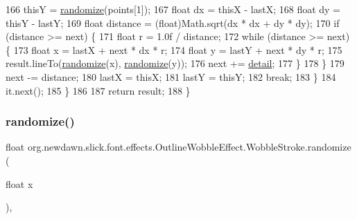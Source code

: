 \begin{DoxyCode}
166                     thisY = \mbox{\hyperlink{classorg_1_1newdawn_1_1slick_1_1font_1_1effects_1_1_outline_wobble_effect_1_1_wobble_stroke_a6aa4ed3188495bd4abcf9b2862615330}{randomize}}(points[1]);
167                     \textcolor{keywordtype}{float} dx = thisX - lastX;
168                     \textcolor{keywordtype}{float} dy = thisY - lastY;
169                     \textcolor{keywordtype}{float} distance = (float)Math.sqrt(dx * dx + dy * dy);
170                     \textcolor{keywordflow}{if} (distance >= next) \{
171                         \textcolor{keywordtype}{float} r = 1.0f / distance;
172                         \textcolor{keywordflow}{while} (distance >= next) \{
173                             \textcolor{keywordtype}{float} x = lastX + next * dx * r;
174                             \textcolor{keywordtype}{float} y = lastY + next * dy * r;
175                             result.lineTo(\mbox{\hyperlink{classorg_1_1newdawn_1_1slick_1_1font_1_1effects_1_1_outline_wobble_effect_1_1_wobble_stroke_a6aa4ed3188495bd4abcf9b2862615330}{randomize}}(x), \mbox{\hyperlink{classorg_1_1newdawn_1_1slick_1_1font_1_1effects_1_1_outline_wobble_effect_1_1_wobble_stroke_a6aa4ed3188495bd4abcf9b2862615330}{randomize}}(y));
176                             next += \mbox{\hyperlink{classorg_1_1newdawn_1_1slick_1_1font_1_1effects_1_1_outline_wobble_effect_ac43d2a2c878ac5034bf82a0837cfa86f}{detail}};
177                         \}
178                     \}
179                     next -= distance;
180                     lastX = thisX;
181                     lastY = thisY;
182                     \textcolor{keywordflow}{break};
183                 \}
184                 it.next();
185             \}
186 
187             \textcolor{keywordflow}{return} result;
188         \}
\end{DoxyCode}
\mbox{\label{classorg_1_1newdawn_1_1slick_1_1font_1_1effects_1_1_outline_wobble_effect_1_1_wobble_stroke_a6aa4ed3188495bd4abcf9b2862615330}} 
\subsubsection{\texorpdfstring{randomize()}{randomize()}}
{\footnotesize\ttfamily float org.\+newdawn.\+slick.\+font.\+effects.\+Outline\+Wobble\+Effect.\+Wobble\+Stroke.\+randomize (\begin{DoxyParamCaption}\item[{float}]{x }\end{DoxyParamCaption})\hspace{0.3cm}{\ttfamily [inline]}, {\ttfamily [private]}}

